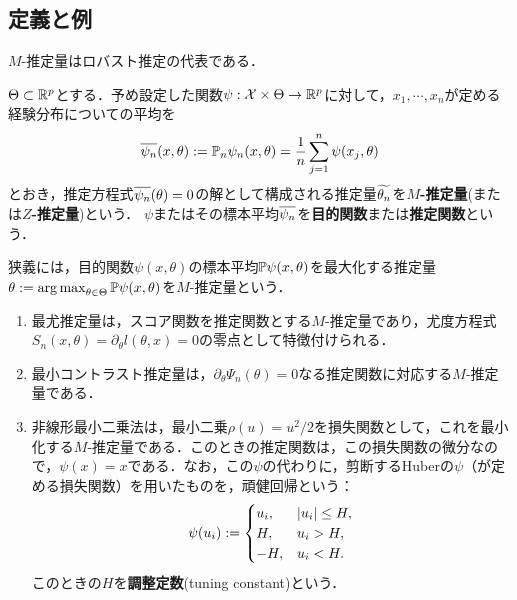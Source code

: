 \documentclass[uplatex,dvipdfmx]{jsreport}
\begin{document}
\subsection{定義と例}

\begin{tcolorbox}[colframe=ForestGreen, colback=ForestGreen!10!white,breakable,colbacktitle=ForestGreen!40!white,coltitle=black,fonttitle=\bfseries\sffamily,
title=]
    $M$-推定量はロバスト推定の代表である．
\end{tcolorbox}

\begin{definition}
    $\Theta\subset\mathbb{R}^p$とする．予め設定した関数$\psi:\mathcal{X}\times\Theta\to\mathbb{R}^p$に対して，$x_1,\cdots,x_n$が定める経験分布についての平均を
    \[\overline{\psi_n}(x,\theta):=\mathbb{P}_n\psi_n(x,\theta)=\frac{1}{n}\sum^n_{j=1}\psi(x_j,\theta)\]
    とおき，推定方程式$\overline{\psi_n}(\theta)=0$の解として構成される推定量$\widetilde{\theta_n}$を\textbf{$M$-推定量}(または\textbf{$Z$-推定量})という．
    $\psi$またはその標本平均$\overline{\psi_n}$を\textbf{目的関数}または\textbf{推定関数}という．
\end{definition}
\begin{remark}
    狭義には，目的関数$\psi(x,\theta)$の標本平均$\mathbb{P}\psi(x,\theta)$を最大化する推定量$\theta:=\operatorname*{arg\,max}_{\theta\in\Theta}\mathbb{P}\psi(x,\theta)$を$M$-推定量という．
\end{remark}

\begin{example}\mbox{}
    \begin{enumerate}
        \item 最尤推定量は，スコア関数を推定関数とする$M$-推定量であり，尤度方程式$S_n(x,\theta)=\partial_\theta l(\theta,x)=0$の零点として特徴付けられる．
        \item 最小コントラスト推定量は，$\partial_\theta\Psi_n(\theta)=0$なる推定関数に対応する$M$-推定量である．
        \item 非線形最小二乗法は，最小二乗$\rho(u)=u^2/2$を損失関数として，これを最小化する$M$-推定量である．このときの推定関数は，この損失関数の微分なので，$\psi(x)=x$である．なお，この$\psi$の代わりに，剪断するHuberの$\psi$（が定める損失関数）を用いたものを，頑健回帰という：
        \[\psi(u_i):=\begin{cases}
            u_i,&\lvert u_i\rvert\le H,\\
            H,&u_i>H,\\
            -H,&u_i<H.
        \end{cases}\]
        このときの$H$を\textbf{調整定数}(tuning constant)という．
    \end{enumerate}
\end{example}
\end{document}
